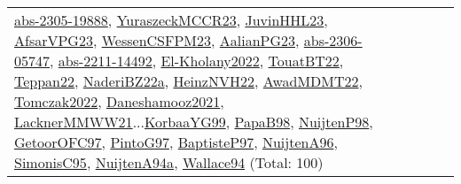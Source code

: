 {\begin{longtable}{p{3cm}r>{\raggedright\arraybackslash}p{6cm}>{\raggedright\arraybackslash}p{6cm}>{\raggedright\arraybackslash}p{8cm}}
\hyperref[detail:abs-2305-19888]{abs-2305-19888}, \hyperref[detail:YuraszeckMCCR23]{YuraszeckMCCR23}, \hyperref[detail:JuvinHHL23]{JuvinHHL23}, \hyperref[detail:AfsarVPG23]{AfsarVPG23}, \hyperref[detail:WessenCSFPM23]{WessenCSFPM23}, \hyperref[detail:AalianPG23]{AalianPG23}, \hyperref[detail:abs-2306-05747]{abs-2306-05747}, \hyperref[detail:abs-2211-14492]{abs-2211-14492}, \hyperref[detail:El-Kholany2022]{El-Kholany2022}, \hyperref[detail:TouatBT22]{TouatBT22}, \hyperref[detail:Teppan22]{Teppan22}, \hyperref[detail:NaderiBZ22a]{NaderiBZ22a}, \hyperref[detail:HeinzNVH22]{HeinzNVH22}, \hyperref[detail:AwadMDMT22]{AwadMDMT22}, \hyperref[detail:Tomczak2022]{Tomczak2022}, \hyperref[detail:Daneshamooz2021]{Daneshamooz2021}, \hyperref[detail:LacknerMMWW21]{LacknerMMWW21}...\hyperref[detail:KorbaaYG99]{KorbaaYG99}, \hyperref[detail:PapaB98]{PapaB98}, \hyperref[detail:NuijtenP98]{NuijtenP98}, \hyperref[detail:GetoorOFC97]{GetoorOFC97}, \hyperref[detail:PintoG97]{PintoG97}, \hyperref[detail:BaptisteP97]{BaptisteP97}, \hyperref[detail:NuijtenA96]{NuijtenA96}, \hyperref[detail:SimonisC95]{SimonisC95}, \hyperref[detail:NuijtenA94a]{NuijtenA94a}, \hyperref[detail:Wallace94]{Wallace94} (Total: 100)\\

\end{longtable}}
